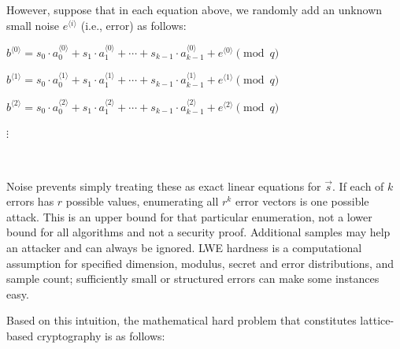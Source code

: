 However, suppose that in each equation above, we randomly add an unknown small noise $e^{\langle i \rangle}$ (i.e., error) as follows: 

$b^{\langle 0 \rangle} = s_0\cdot a_{0}^{\langle 0 \rangle} + s_1\cdot a_{1}^{\langle 0 \rangle} + \cdots + s_{k-1}\cdot a_{k-1}^{\langle 0 \rangle} + e^{\langle 0 \rangle} \pmod q$

$b^{\langle 1 \rangle} = s_0\cdot a_{0}^{\langle 1 \rangle} + s_1\cdot a_{1}^{\langle 1 \rangle} + \cdots + s_{k-1}\cdot a_{k-1}^{\langle 1 \rangle} + e^{\langle 1 \rangle} \pmod q$

$b^{\langle 2 \rangle} = s_0\cdot a_{0}^{\langle 2 \rangle} + s_1\cdot a_{1}^{\langle 2 \rangle} + \cdots + s_{k-1}\cdot a_{k-1}^{\langle 2 \rangle} + e^{\langle 2 \rangle} \pmod q$

\text{ } $\vdots$


$ $

Noise prevents simply treating these as exact linear equations for $\vec s$. If each of $k$ errors has $r$ possible values, enumerating all $r^k$ error vectors is one possible attack. This is an upper bound for that particular enumeration, not a lower bound for all algorithms and not a security proof. Additional samples may help an attacker and can always be ignored. LWE hardness is a computational assumption for specified dimension, modulus, secret and error distributions, and sample count; sufficiently small or structured errors can make some instances easy.

Based on this intuition, the mathematical hard problem that constitutes lattice-based cryptography is as follows:

$ $

